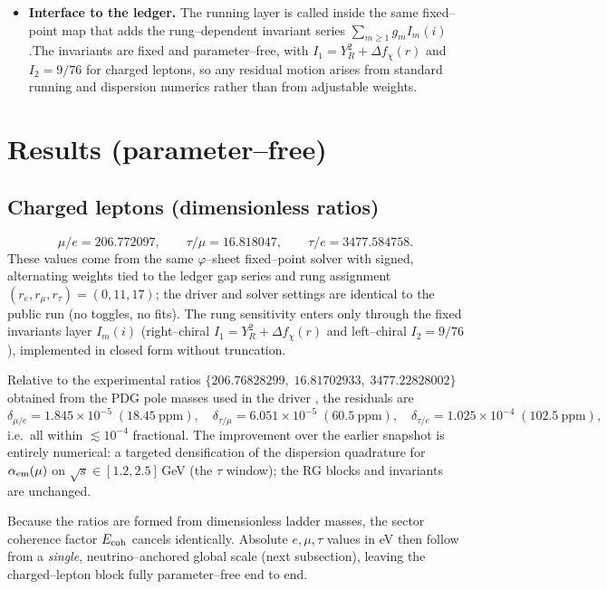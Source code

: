\documentclass[11pt]{article}
\begin{document}
\begin{itemize}
  \item \textbf{Interface to the ledger.} The running layer is called inside the same fixed--point map that adds the rung--dependent invariant series $\sum_{m\ge1}g_m I_m(i)$.\;The invariants are fixed and parameter--free, with $I_1=Y_R^2+\Delta f_\chi(r)$ and $I_2=9/76$ for charged leptons, so any residual motion arises from standard running and dispersion numerics rather than from adjustable weights.
\end{itemize}

\section{Results (parameter--free)}
\subsection{Charged leptons (dimensionless ratios)}
\[
\mu/e=206.772097,\qquad \tau/\mu=16.818047,\qquad \tau/e=3477.584758.
\]
These values come from the same $\varphi$--sheet fixed--point solver with signed, alternating weights tied to the ledger gap series and rung assignment $(r_e,r_\mu,r_\tau)=(0,11,17)$; the driver and solver settings are identical to the public run (no toggles, no fits). The rung sensitivity enters only through the fixed invariants layer $I_m(i)$ (right--chiral $I_1=Y_R^2+\Delta f_\chi(r)$ and left--chiral $I_2=9/76$), implemented in closed form without truncation.

Relative to the experimental ratios $\{206.76828299,\; 16.81702933,\; 3477.22828002\}$ obtained from the PDG pole masses used in the driver \cite{PDG2024}, the residuals are
\[
\delta_{\mu/e}=1.845\times10^{-5}\;(18.45~\mathrm{ppm}),\quad
\delta_{\tau/\mu}=6.051\times10^{-5}\;(60.5~\mathrm{ppm}),\quad
\delta_{\tau/e}=1.025\times10^{-4}\;(102.5~\mathrm{ppm}),
\]
 i.e.\ all within $\lesssim 10^{-4}$ fractional. The improvement over the earlier snapshot is entirely numerical: a targeted densification of the dispersion quadrature for $\alpha_{\rm em}(\mu)$ on $\sqrt{s}\!\in[1.2,2.5]\,$GeV (the $\tau$ window); the RG blocks and invariants are unchanged.

Because the ratios are formed from dimensionless ladder masses, the sector coherence factor $E_{\rm coh}$ cancels identically. Absolute $e,\mu,\tau$ values in eV then follow from a \emph{single}, neutrino–anchored global scale (next subsection), leaving the charged–lepton block fully parameter–free end to end.
\end{document}
